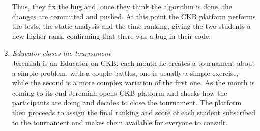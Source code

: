 \documentclass[12pt, a4paper]{report}
\begin{document}
\begin{enumerate}
            Thus, they fix the bug and, once they think the algorithm is done, the changes are committed and pushed.
            At this point the CKB platform performs the tests, the static analysis and the time ranking, giving the two students a new higher rank, confirming that there was a bug in their code.
        \item \textit{Educator closes the tournament} \\
            Jeremiah is an Educator on CKB, each month he creates a tournament about a simple problem, with a couple battles,
            one is usually a simple exercise, while the second is a more complex variation of the first one.
            As the month is coming to its end Jeremiah opens CKB platform and checks how the participants are doing and decides to close the tournament.
            The platform then proceeds to assign the final ranking and score of each student subscribed to the tournament and makes them available for everyone to consult. 
    \end{enumerate}
\end{document}
